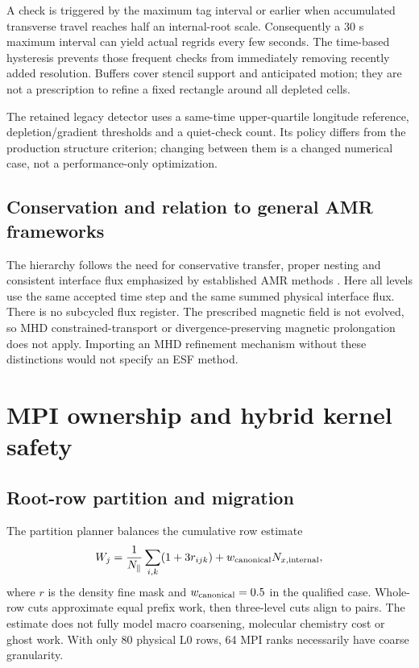 A check is triggered by the maximum tag interval or earlier when accumulated
transverse travel reaches half an internal-root scale. Consequently a
30 s maximum interval can yield actual regrids every few seconds. The
time-based hysteresis prevents those frequent checks from immediately
removing recently added resolution. Buffers cover stencil support and
anticipated motion; they are not a prescription to refine a fixed rectangle
around all depleted cells.

The retained legacy detector uses a same-time upper-quartile longitude
reference, depletion/gradient thresholds and a quiet-check count. Its
policy differs from the production structure criterion; changing between
them is a changed numerical case, not a performance-only optimization.

\subsection{Conservation and relation to general AMR frameworks}
The hierarchy follows the need for conservative transfer, proper nesting
and consistent interface flux emphasized by established AMR methods
\citep{BergerColella,Stone2020,Toth2012}. Here all levels use the same
accepted time step and the same summed physical interface flux. There is
no subcycled flux register. The prescribed magnetic field is not evolved,
so MHD constrained-transport or divergence-preserving magnetic prolongation
does not apply. Importing an MHD refinement mechanism without these
distinctions would not specify an ESF method.

\section{MPI ownership and hybrid kernel safety}
\subsection{Root-row partition and migration}
The partition planner balances the cumulative row estimate
\begin{equation}
 W_j=\frac1{N_\parallel}\sum_{i,k}(1+3r_{ijk})+
 w_{\rm canonical}N_{x,\rm internal},
\end{equation}
where $r$ is the density fine mask and $w_{\rm canonical}=0.5$ in the
qualified case. Whole-row cuts approximate equal prefix work, then
three-level cuts align to pairs. The estimate does not fully model
macro coarsening, molecular chemistry cost or ghost work. With only 80
physical L0 rows, 64 MPI ranks necessarily have coarse granularity.

